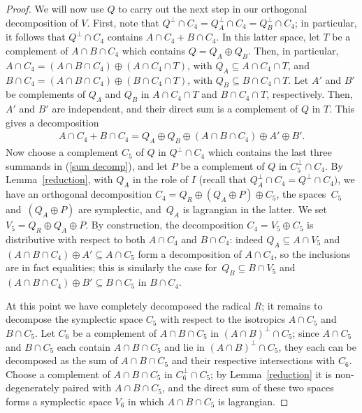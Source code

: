 \documentclass[10pt,a4paper]{amsart}
\numberwithin{equation}{section}
\begin{document}
\begin{proof}
We will now use $Q$ to carry out the next step in our orthogonal decomposition of $V$.
First, note that $Q^{\perp} \cap C_4 = Q_A^{\perp} \cap C_4 = Q_B^{\perp} \cap C_4$; in particular, it follows that $Q^{\perp} \cap C_4$ contains $A \cap C_4 + B \cap C_4$. In this latter space, let $T$ be a complement of $A \cap B \cap C_4$ which contains $Q = Q_A \oplus Q_B$. Then, in particular, $A \cap C_4 = (A \cap B \cap C_4) \oplus (A \cap C_4 \cap T)$, with $Q_A \subseteq A \cap C_4 \cap T$, and $B \cap C_4 = (A \cap B \cap C_4) \oplus (B \cap C_4 \cap T)$, with $Q_B \subseteq B \cap C_4 \cap T$. Let $A'$ and $B'$ be complements of $Q_A$ and $Q_B$ in $A \cap C_4 \cap T$ and $B \cap C_4 \cap T$, respectively. Then, $A'$ and $B'$ are independent, and their direct sum is a complement of $Q$ in $T$. This gives a decomposition
\begin{gather}\label{sum decomp}
A \cap C_4 + B \cap C_4 = Q_A \oplus Q_B \oplus (A \cap B \cap C_4) \oplus A' \oplus B'.
\end{gather}
Now choose a complement $C_5$ of $Q$ in $Q^{\perp} \cap C_4$ which contains the last three summands in (\ref{sum decomp}), and let $P$ be a complement of $Q$ in $C_5^{\perp} \cap C_4$. By Lemma~\ref{reduction}, with $Q_A$ in the role of $I$ (recall that $Q_A^{\perp} \cap C_4 = Q^{\perp} \cap C_4)$, we have an orthogonal decomposition $C_4 = Q_R \oplus (Q_A \oplus P) \oplus C_5$, the spaces~$C_5$ and~$(Q_A \oplus P)$ are symplectic, and~$Q_A$ is lagrangian in the latter. We set $V_5 = Q_R \oplus Q_A \oplus P$. By construction, the decomposition $C_4 = V_5 \oplus C_5$ is distributive with respect to both $A \cap C_4$ and $B \cap C_4$: indeed $Q_A \subseteq A \cap V_5$ and $(A \cap B \cap C_4) \oplus A' \subseteq A \cap C_5$ form a decomposition of $A \cap C_4$, so the inclusions are in fact equalities; this is similarly the case for~$Q_B \subseteq B \cap V_5$ and $(A \cap B \cap C_4) \oplus B' \subseteq B \cap C_5$ in $B \cap C_4$.

At this point we have completely decomposed the radical $R$; it remains to decompose the symplectic space $C_5$ with respect to the isotropics $A \cap C_5$ and $B \cap C_5$. Let $C_6$ be a complement of $A \cap B \cap C_5$ in $(A \cap B)^{\perp} \cap C_5$; since $A \cap C_5$ and $B \cap C_5$ each contain $A \cap B \cap C_5$ and lie in $(A \cap B)^{\perp} \cap C_5$, they each can be decomposed as the sum of $A \cap B \cap C_5$ and their respective intersections with $C_6$.  Choose a complement of $A \cap B \cap C_5$ in $C_6^{\perp} \cap C_5$; by Lemma~\ref{reduction} it is non-degenerately paired with $A \cap B \cap C_5$, and the direct sum of these two spaces forms a symplectic space $V_6$ in which $A \cap B \cap C_5$ is lagrangian.


\end{proof}
\end{document}
